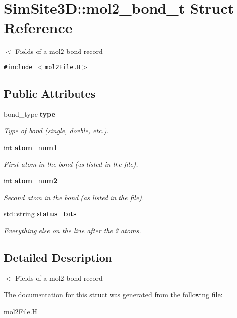 \section{SimSite3D::mol2\_\-bond\_\-t Struct Reference}
\label{structSimSite3D_1_1mol2__bond__t}
$<$ Fields of a mol2 bond record  


{\tt \#include $<$mol2File.H$>$}

\subsection*{Public Attributes}
\begin{CompactItemize}
\item 
bond\_\-type \bf{type}\label{structSimSite3D_1_1mol2__bond__t_777a617664920a145b9140c075474cdb}

\begin{CompactList}\small\item\em Type of bond (single, double, etc.). \item\end{CompactList}\item 
int \bf{atom\_\-num1}\label{structSimSite3D_1_1mol2__bond__t_aec7cb5b3bf6df2d4366f5368df5aef1}

\begin{CompactList}\small\item\em First atom in the bond (as listed in the file). \item\end{CompactList}\item 
int \bf{atom\_\-num2}\label{structSimSite3D_1_1mol2__bond__t_27316559fbc429818786482aa159c1e1}

\begin{CompactList}\small\item\em Second atom in the bond (as listed in the file). \item\end{CompactList}\item 
std::string \bf{status\_\-bits}\label{structSimSite3D_1_1mol2__bond__t_435f1fb617a87b857af38482c60cfa4e}

\begin{CompactList}\small\item\em Everything else on the line after the 2 atoms. \item\end{CompactList}\end{CompactItemize}


\subsection{Detailed Description}
$<$ Fields of a mol2 bond record 



The documentation for this struct was generated from the following file:\begin{CompactItemize}
\item 
mol2File.H\end{CompactItemize}
